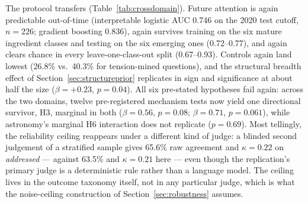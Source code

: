 \documentclass[11pt]{article}
\begin{document}
The protocol transfers (Table~\ref{tab:crossdomain}). Future attention
is again predictable out-of-time (interpretable logistic AUC 0.746 on
the 2020 test cutoff, $n=226$; gradient boosting 0.836), again survives
training on the six mature ingredient classes and testing on the six
emerging ones (0.72--0.77), and again clears chance in every
leave-one-class-out split (0.67--0.93). Controls again land lowest
(26.8\% vs.\ 40.3\% for tension-mined questions), and the structural
breadth effect of Section~\ref{sec:structureprior} replicates in sign
and significance at about half the size ($\beta=+0.23$, $p=0.04$). All
six pre-stated hypotheses fail again: across the two domains, twelve
pre-registered mechanism tests now yield one directional survivor, H3,
marginal in both ($\beta=0.56$, $p=0.08$; $\beta=0.71$, $p=0.061$),
while astronomy's marginal H6 interaction does not replicate
($p=0.69$). Most tellingly, the reliability ceiling reappears under a
different kind of judge: a blinded second judgement of a stratified
sample gives 65.6\% raw agreement and $\kappa=0.22$ on
\emph{addressed} --- against 63.5\% and $\kappa=0.21$ here --- even
though the replication's primary judge is a deterministic rule rather
than a language model. The ceiling lives in the outcome taxonomy
itself, not in any particular judge, which is what the noise-ceiling
construction of Section~\ref{sec:robustness} assumes.
\end{document}
